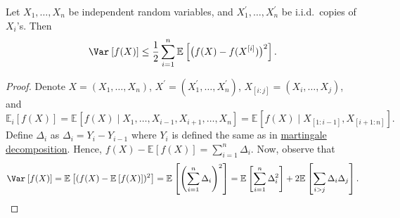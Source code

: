 \begin{theorem}\label{pf-thm:Efron-Stein-inequality}
	Let \(X_1, \dots , X_n\) be independent random variables, and \(X_1^{\prime} , \dots , X_n^{\prime} \) be i.i.d.\ copies of \(X_i\)'s. Then
	\[
		\Var_{}\left[f(X) \right] \leq \frac{1}{2} \sum_{i=1}^{n} \mathbb{E}_{}\left[\big(f(X) - f(X^{[i]}) \big)^2 \right].
	\]
\end{theorem}
\begin{proof}
	Denote \(X = (X_1, \dots , X_n)\), \(X^{\prime} = (X_1^{\prime} , \dots , X_n^{\prime} )\), \(X_{[i:j]} = (X_i, \dots , X_j)\), and
	\[
		\mathbb{E}_{i}\left[f(X) \right]
		= \mathbb{E}_{}\left[f(X) \mid X_1, \dots , X_{i-1}, X_{i+1}, \dots , X_n \right]
		= \mathbb{E}_{}\left[f(X) \mid X_{[1:i-1]}, X_{[i+1:n]} \right] .
	\]
	Define \(\Delta _i\) as \(\Delta _i = Y_i - Y_{i-1} \) where \(Y_i\) is defined the same as in \hyperref[def:martingale-decomposition]{martingale decomposition}. Hence, \(f(X) - \mathbb{E}_{}\left[f(X) \right] = \sum_{i=1}^{n} \Delta _i\). Now, observe that
	\[
		\Var_{}\left[f(X) \right]
		= \mathbb{E}_{}\left[(f(X) - \mathbb{E}_{}\left[f(X) \right] )^2 \right]
		= \mathbb{E}_{}\left[\left( \sum_{i=1}^{n} \Delta _i \right) ^2 \right]
		= \mathbb{E}_{}\left[\sum_{i=1}^{n} \Delta _i ^2 \right] + 2 \mathbb{E}_{}\left[\sum_{i > j} \Delta _i \Delta _j \right] .
	\]


\end{proof}
